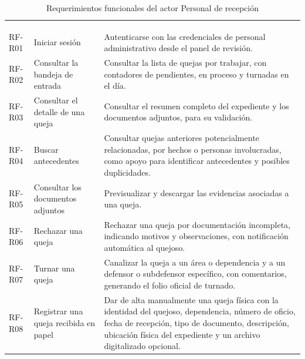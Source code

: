 	\small
	\renewcommand{\arraystretch}{1.2}
	
	\begin{longtable}{|L{1.7cm}|L{4.0cm}|L{9.9cm}|}
		\hiderowcolors\caption{Requerimientos funcionales del actor Personal de recepción}
		\label{tab:rf_recepcion} \\ \showrowcolors
		\hline
		 &  &  \\
		\hline
		\endfirsthead
	
		\hline
		 &  &  \\
		\hline
		\endhead
	
		RF-R01 & Iniciar sesión & Autenticarse con las credenciales de personal administrativo desde
		el panel de revisión. \\ \hline
	
		RF-R02 & Consultar la bandeja de entrada & Consultar la lista de quejas por trabajar, con
		contadores de pendientes, en proceso y turnadas en el día. \\ \hline
	
		RF-R03 & Consultar el detalle de una queja & Consultar el resumen completo del expediente y
		los documentos adjuntos, para su validación. \\ \hline
	
		RF-R04 & Buscar antecedentes & Consultar quejas anteriores potencialmente relacionadas,
		por hechos o personas involucradas, como apoyo para identificar antecedentes y posibles duplicidades. \\ \hline
	
		RF-R05 & Consultar los documentos adjuntos & Previsualizar y descargar las evidencias
		asociadas a una queja. \\ \hline
	
		RF-R06 & Rechazar una queja & Rechazar una queja por documentación incompleta, indicando
		motivos y observaciones, con notificación automática al quejoso. \\ \hline
	
		RF-R07 & Turnar una queja & Canalizar la queja a un área o dependencia y a un defensor o
		subdefensor específico, con comentarios, generando el folio oficial de turnado. \\ \hline
	
		RF-R08 & Registrar una queja recibida en papel & Dar de alta manualmente una queja física
		con la identidad del quejoso, dependencia, número de oficio, fecha de recepción, tipo de
		documento, descripción, ubicación física del expediente y un archivo digitalizado opcional.
		\\ \hline
	

\end{longtable}
